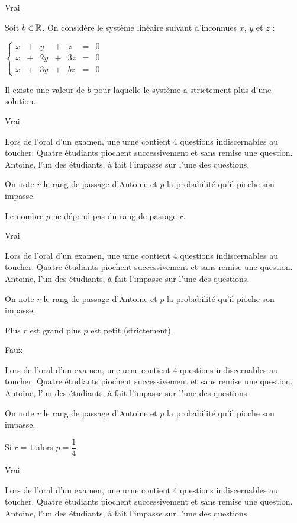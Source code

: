 \documentclass{article}
\begin{document}
\reponse Vrai

\question Soit $b \in \mathbb{R}$. On considère le système linéaire suivant d'inconnues $x$, $y$ et $z$ :

$ \left\lbrace \begin{array}{ccccccc}
x & + &  y & + &  z &  = & 0  \\
x & + & 2y & + & 3z &  = & 0  \\
x & + & 3y & + & bz &  = & 0  
\end{array} \right. $

Il existe une valeur de $b$ pour laquelle le système a strictement plus d'une solution.

\reponse Vrai

\question Lors de l'oral d'un examen, une urne contient 4 questions indiscernables au toucher. Quatre étudiants piochent successivement et sans remise une question. Antoine, l'un des étudiants, à fait l'impasse sur l'une des questions.

On note $r$ le rang de passage d'Antoine et $p$ la probabilité qu'il pioche son impasse.

Le nombre $p$ ne dépend pas du rang de passage $r$.


\reponse Vrai

\question Lors de l'oral d'un examen, une urne contient 4 questions indiscernables au toucher. Quatre étudiants piochent successivement et sans remise une question. Antoine, l'un des étudiants, à fait l'impasse sur l'une des questions.

On note $r$ le rang de passage d'Antoine et $p$ la probabilité qu'il pioche son impasse.

Plus $r$ est grand plus $p$ est petit (strictement).

\reponse Faux

\question Lors de l'oral d'un examen, une urne contient 4 questions indiscernables au toucher. Quatre étudiants piochent successivement et sans remise une question. Antoine, l'un des étudiants, à fait l'impasse sur l'une des questions.

On note $r$ le rang de passage d'Antoine et $p$ la probabilité qu'il pioche son impasse.

Si $r=1$ alors $p = \dfrac{1}{4}$.

\reponse Vrai

\question Lors de l'oral d'un examen, une urne contient 4 questions indiscernables au toucher. Quatre étudiants piochent successivement et sans remise une question. Antoine, l'un des étudiants, à fait l'impasse sur l'une des questions.
\end{document}
